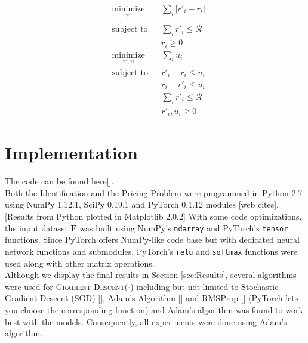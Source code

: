 \documentclass[12pt]{article}
\newcommand{\vect}[1]{\mathbf{#1}}  %
\newcommand{\matr}[1]{\mathbf{#1}}  %
\begin{document}
    \begin{multicols}{2}
        \begin{equation} \label{eq:lp_math_constrain_rewards}
        \begin{aligned}
            & \underset{\vect{r'}}{\text{minimize}}
            & & \sum_{i}|r'_i - r_i|\\ \\
            & \text{subject to}
            & & \sum_{i}r'_i \leq \mathcal{R}\\
            &&& r_i \geq 0
        \end{aligned}
        \end{equation}\break
        \begin{equation} \label{eq:lp_code_constrain_rewards}
        \begin{aligned}
            & \underset{\vect{r'}, \vect{u}}{\text{minimize}}
            & & \sum_{i} u_i\\
            & \text{subject to}
            & & r'_i - r_i \leq u_i\\
            &&& r_i - r'_i \leq u_i\\
            &&& \sum_{i} r'_i \leq \mathcal{R}\\
            &&& r'_i, u_i \geq 0
        \end{aligned}
        \end{equation}
    \end{multicols}

    \section{Implementation} \label{sec:Implementation}
    The code can be found here[]. \\
    Both the Identification and the Pricing Problem were programmed in Python 2.7 using NumPy 1.12.1, SciPy 0.19.1 and PyTorch 0.1.12 modules [web cites]. [Results from Python plotted in Matplotlib 2.0.2] With some code optimizations, the input dataset $\matr{F}$ was built using NumPy's \texttt{ndarray} and PyTorch's \texttt{tensor} functions. Since PyTorch offers NumPy-like code base but with dedicated neural network functions and submodules, PyTorch's \texttt{relu} and \texttt{softmax} functions were used along with other matrix operations.\\
    
    Although we display the final results in Section \ref{sec:Results}, several algorithms were used for \textsc{Gradient-Descent}($\cdot$) including but not limited to Stochastic Gradient Descent (SGD) [], Adam's Algorithm [] and RMSProp [] (PyTorch lets you choose the corresponding function) and Adam's algorithm was found to work best with the models. Consequently, all experiments were done using Adam's algorithm.
    
\end{document}
